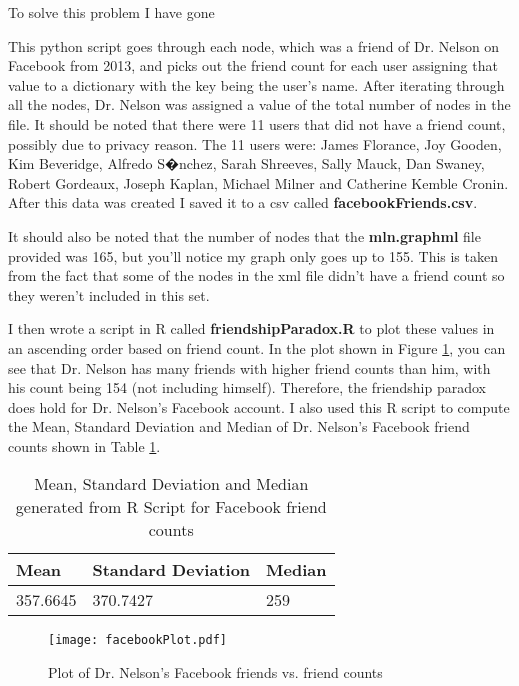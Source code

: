 \documentclass[letterpaper,11pt]{article}
\begin{document}
To solve this problem I have gone 

This python script goes through each node, which was a friend of Dr. Nelson on Facebook from 2013, and picks out the friend count for each user assigning that value to a dictionary with the key being the user's name. After iterating through all the nodes, Dr. Nelson was assigned a value of the total number of nodes in the file. It should be noted that there were 11 users that did not have a friend count, possibly due to privacy reason. The 11 users were: James Florance, Joy Gooden, Kim Beveridge, Alfredo S�nchez, Sarah Shreeves, Sally Mauck, Dan Swaney, Robert Gordeaux, Joseph Kaplan, Michael Milner and Catherine Kemble Cronin. After this data was created I saved it to a csv called \textbf{facebookFriends.csv}.

It should also be noted that the number of nodes that the \textbf{mln.graphml} file provided was 165, but you'll notice my graph only goes up to 155. This is taken from the fact that some of the nodes in the xml file didn't have a friend count so they weren't included in this set.

I then wrote a script in R called \textbf{friendshipParadox.R} to plot these values in an ascending order based on friend count. In the plot shown in Figure \ref{fig:q1facebookplot}, you can see that Dr. Nelson has many friends with higher friend counts than him, with his count being 154 (not including himself). Therefore, the friendship paradox does hold for Dr. Nelson's Facebook account. I also used this R script to compute the Mean, Standard Deviation and Median of Dr. Nelson's Facebook friend counts shown in Table \ref{table:q1summary}.

\begin{table}[htb]
\centering
\begin{tabular}{ | l | l | l |}
\hline
\textbf{Mean} & \textbf{Standard Deviation} & \textbf{Median} \\
\hline
357.6645 & 370.7427 & 259 \\
\hline
\end{tabular}
\caption{Mean, Standard Deviation and Median generated from R Script for Facebook friend counts}
\label{table:q1summary}
\end{table}

\begin{figure}[h]
\centering
\texttt{[image: facebookPlot.pdf]}
\caption{Plot of Dr. Nelson's Facebook friends vs. friend counts}
\label{fig:q1facebookplot}
\end{figure}
\end{document}
